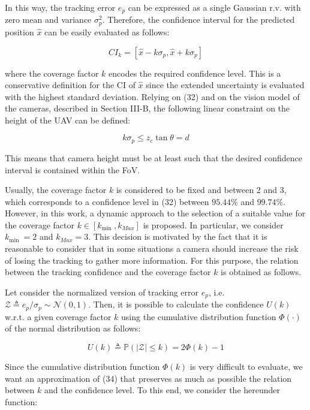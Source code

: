 \documentclass[conference]{IEEEtran}
\begin{document}
In this way, the tracking error $e_{p}$ can be expressed as a single Gaussian r.v. with zero mean and variance $\sigma_{p}^{2}$. Therefore, the confidence interval for the predicted position $\hat{x}$ can be easily evaluated as follows:


\begin{equation*}
C I_{k}=\left[\hat{x}-k \sigma_{p}, \hat{x}+k \sigma_{p}\right] \tag{32}
\end{equation*}


where the coverage factor $k$ encodes the required confidence level. This is a conservative definition for the CI of $\hat{x}$ since the extended uncertainty is evaluated with the highest standard deviation. Relying on (32) and on the vision model of the cameras, described in Section III-B, the following linear constraint on the height of the UAV can be defined:


\begin{equation*}
k \sigma_{p} \leq z_{c} \tan \theta=d \tag{33}
\end{equation*}


This means that camera height must be at least such that the desired confidence interval is contained within the FoV.

Usually, the coverage factor $k$ is considered to be fixed and between 2 and 3, which corresponds to a confidence level in (32) between $95.44 \%$ and $99.74 \%$. However, in this work, a dynamic approach to the selection of a suitable value for the coverage factor $k \in\left[k_{\text {min }}, k_{M a x}\right]$ is proposed. In particular, we consider $k_{\text {min }}=2$ and $k_{M a x}=3$. This decision is motivated by the fact that it is reasonable to consider that in some situations a camera should increase the risk of losing the tracking to gather more information. For this purpose, the relation between the tracking confidence and the coverage factor $k$ is obtained as follows.

Let consider the normalized version of tracking error $e_{p}$, i.e. $\mathcal{Z} \triangleq e_{p} / \sigma_{p} \sim \mathcal{N}(0,1)$. Then, it is possible to calculate the confidence $U(k)$ w.r.t. a given coverage factor $k$ using the cumulative distribution function $\Phi(\cdot)$ of the normal distribution as follows:


\begin{equation*}
U(k) \triangleq \mathbb{P}(|\mathcal{Z}| \leq k)=2 \Phi(k)-1 \tag{34}
\end{equation*}


Since the cumulative distribution function $\Phi(k)$ is very difficult to evaluate, we want an approximation of (34) that preserves as much as possible the relation between $k$ and the confidence level. To this end, we consider the hereunder function:
\end{document}
